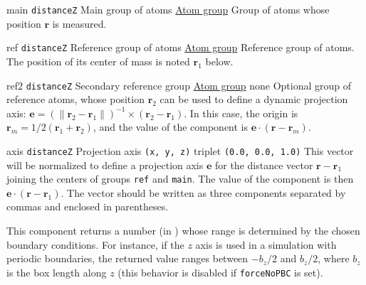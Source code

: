 \begin{cvcoptions}
\item %
  \key
    {main}{%
    \texttt{distanceZ}}{%
    Main group of atoms}{%
    \hyperref[sec:colvar_atom_groups]{Atom group}}{%
    Group of atoms whose position $\bm{r}$ is measured.}

\item %
  \key
    {ref}{%
    \texttt{distanceZ}}{%
    Reference group of
    atoms}{%
    \hyperref[sec:colvar_atom_groups]{Atom group}}{%
    Reference group of atoms.  The position of its center of mass is
    noted $\bm{r}_1$ below.}

\item %
  \keydef
    {ref2}{%
    \texttt{distanceZ}}{%
    Secondary reference
    group}{%
    \hyperref[sec:colvar_atom_groups]{Atom group}}{%
    none}{%
    Optional group of reference atoms, whose position $\bm{r}_2$ can
    be used to define a dynamic projection axis: $\bm{e}=(\| \bm{r}_2
    - \bm{r}_1\|)^{-1} \times (\bm{r}_2 - \bm{r}_1)$.  In this case,
    the origin is $\bm{r}_m = 1/2 (\bm{r}_1+\bm{r}_2)$, and the value
    of the component is $\bm{e} \cdot (\bm{r}-\bm{r}_m)$.}

\item %
  \keydef
    {axis}{%
    \texttt{distanceZ}}{%
    Projection axis}{%
    \texttt{(x, y, z)} triplet}{%
    \texttt{(0.0, 0.0, 1.0)}}{%
    This vector will be normalized to define a
    projection axis $\bm{e}$ for the distance vector $\bm{r} -
    \bm{r}_1$ joining the centers of groups \texttt{ref} and
    \texttt{main}. The value of the component is then $\bm{e} \cdot
    (\bm{r}-\bm{r}_1)$.  The vector should be written as three
    components separated by commas and enclosed in parentheses.}

\item %
\end{cvcoptions}
This component returns a number (in \lengthunit) whose range is determined
by the chosen boundary conditions.  For instance, if the $z$ axis is
used in a simulation with periodic boundaries, the returned value ranges
between $-b_{z}/2$ and $b_{z}/2$, where $b_{z}$ is the box length
along $z$ (this behavior is disabled if \texttt{forceNoPBC} is set).



